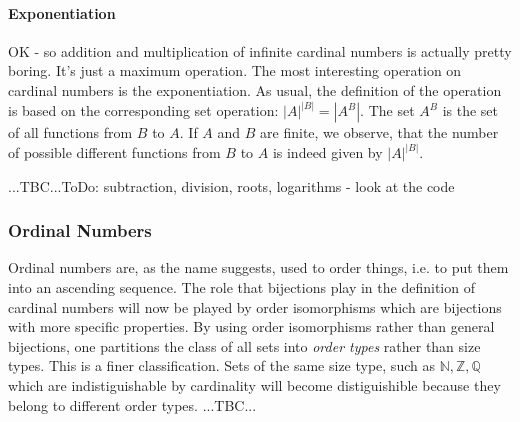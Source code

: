 
\paragraph{Exponentiation} OK - so addition and multiplication of infinite cardinal numbers is actually pretty boring. It's just a maximum operation. The most interesting operation on cardinal numbers is the exponentiation. As usual, the definition of the operation is based on the corresponding set operation: $|A|^{|B|} = |A^B|$. The set $A^B$ is the set of all functions from $B$ to $A$. If $A$ and $B$ are finite, we observe, that the number of possible different functions from $B$ to $A$ is indeed given by $|A|^{|B|}$.




...TBC...ToDo: subtraction, division, roots, logarithms - look at the code







%



\subsubsection{Ordinal Numbers}
Ordinal numbers are, as the name suggests, used to order things, i.e. to put them into an ascending sequence. The role that bijections play in the definition of cardinal numbers will now be played by order isomorphisms which are bijections with more specific properties. By using order isomorphisms rather than general bijections, one partitions the class of all sets into \emph{order types} rather than size types. This is a finer classification. Sets of the same size type, such as $\mathbb{N}, \mathbb{Z}, \mathbb{Q}$ which are indistiguishable by cardinality will become distiguishible because they belong to different order types. ...TBC...


